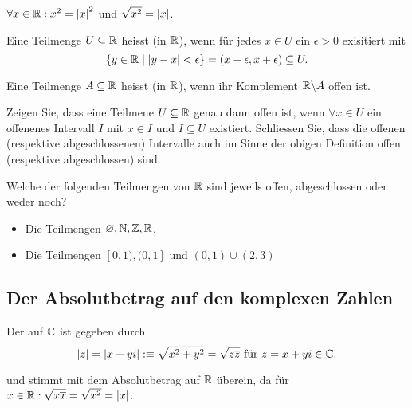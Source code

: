 \begin{ex} $\forall x \in \mathbb{R}: x^2 = \left|x\right|^2$ und $\sqrt{x^2} = \left|x\right|$.
\end{ex}

\begin{mydef}
  Eine Teilmenge $U \subseteq \mathbb{R}$ heisst  (in $\mathbb{R}$), wenn für jedes $x \in U$ ein $\epsilon >0$ exisitiert mit
  \[
    \{ y \in \mathbb{R} \mid \left|y-x\right| < \epsilon \} = (x-\epsilon, x + \epsilon) \subseteq U.
  \]

  Eine Teilmenge $A \subseteq \mathbb{R}$ heisst  (in $\mathbb{R}$), wenn ihr Komplement $\mathbb{R} \backslash A$ offen ist.
\end{mydef}

\begin{ex}
  Zeigen Sie, dass eine Teilmene $U \subseteq \mathbb{R}$ genau dann offen ist, wenn $\forall x \in U$ ein offenenes Intervall $I$ mit $x \in I$ und $I \subseteq U$ existiert. Schliessen Sie, dass die offenen (respektive abgeschlossenen) Intervalle auch im Sinne der obigen Definition offen (respektive abgeschlossen) sind.
\end{ex}

\begin{ex}
  Welche der folgenden Teilmengen von $\mathbb{R}$ sind jeweils offen, abgeschlossen oder weder noch?
  \begin{itemize}
    \item Die Teilmengen $\varnothing, \mathbb{N}, \mathbb{Z}, \mathbb{R}$.
    \item Die Teilmengen $[0,1), (0,1]$ und $(0,1) \cup (2,3)$
  \end{itemize}
\end{ex}

\subsection{Der Absolutbetrag auf den komplexen Zahlen}

\begin{mydef}[Absolutbetrag]
  Der  auf $\mathbb{C}$ ist gegeben durch
  \[
    \abs{z} = \abs{x + yi} :\equiv \sqrt{x^2 + y^2} = \sqrt{z \overline z} $ für $z=x+yi \in \compl.
  \]

  und stimmt mit dem Absolutbetrag auf $\mathbb{R}$ überein, da für $x \in \mathbb{R}: \sqrt{x \overline x} = \sqrt{x^2} = \left|x\right|$.
\end{mydef}

